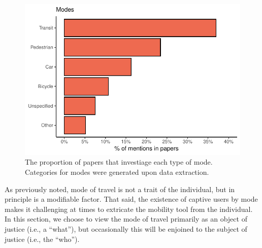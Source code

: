 \documentclass[12pt, oneside]{report}
\begin{document}
\begin{figure}

{\centering \includegraphics{just-transportation_files/figure-pdf/fig-fig5-1.pdf}

}

\caption{\label{fig-fig5}The proportion of papers that investiage each
type of mode. Categories for modes were generated upon data extraction.}

\end{figure}

As previously noted, mode of travel is not a trait of the individual,
but in principle is a modifiable factor. That said, the existence of
captive users by mode makes it challenging at times to extricate the
mobility tool from the individual. In this section, we choose to view
the mode of travel primarily as an object of justice (i.e., a ``what''),
but occasionally this will be enjoined to the subject of justice (i.e.,
the ``who'').
\end{document}
